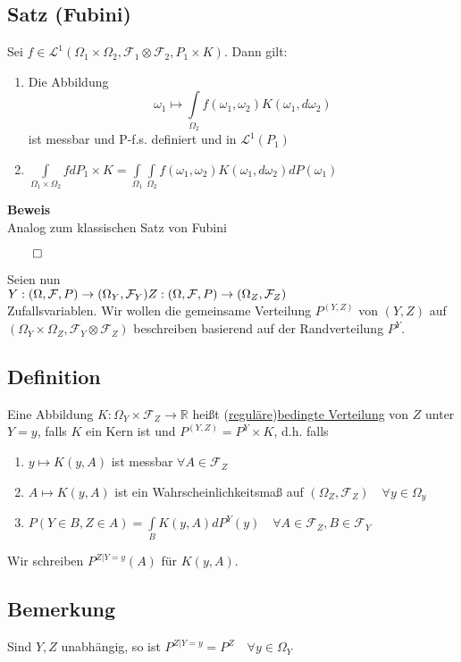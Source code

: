 \documentclass[german,10pt,oneside, fleqn, a4paper]{article}
\newcommand {\R}	{\mathbb{R}}
\newcommand{\ra}{\rightarrow}
\newcommand{\brc}[1]{\left(#1\right)}
\newcommand{\QED}{\begin{flushright}$\qed$\end{flushright}}
\newcommand{\mc}[1]{\mathcal{#1}}
\newcommand{\lp}[1]{\mc{L}^{#1}}
\newcommand{\beweis}{\textbf{Beweis}\\}
\newcommand{\1}[1]{1_{#1}}
\newcommand{\2}[1]{\1{\brac{#1}}}
\newcommand{\raum}{\brc{\Omega,\mc{F},P}}
\newcommand{\f}{\mc{F}}
\newcommand{\qf}{\quad\forall}
\begin{document}
\subsection{Satz (Fubini)}
\label{7.3}
\label{Fubini}
Sei $f\in\lp{1}(\Omega_1\times\Omega_2,\f_1\otimes\f_2,P_1\times K)$. Dann gilt: \begin{enumerate}[label=(\roman*)]
\item Die Abbildung \[
\omega_1\mapsto\int\limits_{\Omega_2}f(\omega_1,\omega_2)K(\omega_1,d\omega_2)\]
ist messbar und P-f.s. definiert und in $\lp{1}(P_1)$
\item $\int\limits_{\Omega_1\times\Omega_2}fdP_1\times K=\int\limits_{\Omega_1}\int\limits_{\Omega_2}f(\omega_1,\omega_2)K(\omega_1,d\omega_2)dP(\omega_1)$
\end{enumerate}
\beweis
Analog zum klassischen Satz von Fubini\QED






Seien nun \\
$Y:\raum\ra(\Omega_Y,\f_Y)\\
Z:\raum\ra(\Omega_Z,\f_Z)$\\
Zufallsvariablen. Wir wollen die gemeinsame Verteilung $P^{(Y,Z)}$ von $(Y,Z)$ auf $(\Omega_Y\times\Omega_Z,\f_Y\otimes\f_Z)$ beschreiben basierend auf der Randverteilung $P^Y$.

\subsection{Definition}
\label{7.4}
Eine Abbildung $K:\Omega_Y\times\f_Z\ra\R$ heißt (\underline{reguläre})\underline{bedingte Verteilung} von $Z$ unter $Y=y$, falls $K$ ein Kern ist und $P^{(Y,Z)}=P^Y\times K$, d.h. falls\begin{enumerate}[label=(\roman*)]
\item $y\mapsto K(y,A)$ ist messbar $\forall A\in\f_Z$
\item $A\mapsto K(y,A)$ ist ein Wahrscheinlichkeitsmaß auf $(\Omega_Z,\f_Z)\qf y\in\Omega_y$
\item $P(Y\in B,Z\in A)=\int\limits_BK(y,A)dP^Y(y)\qf A\in\f_Z,B\in\f_Y$
\end{enumerate}
Wir schreiben $P^{Z|Y=y}(A)$ für $K(y,A)$.

\subsection{Bemerkung}
\label{7.5}
Sind $Y,Z$ unabhängig, so ist $P^{Z|Y=y}=P^Z\qf y\in\Omega_Y$
\end{document}
